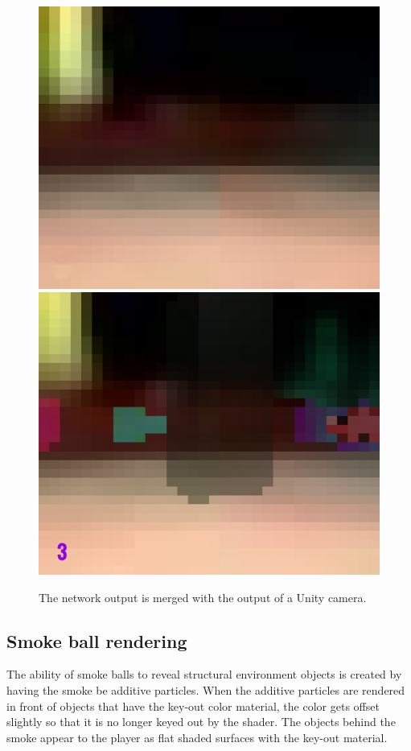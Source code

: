 \begin{figure}[p]
  \centering
  \includegraphics[width=\imgWidth]{images/neural_network_systems/NoOverlay.png} \\[\picVdist]
  \includegraphics[width=\imgWidth]{images/neural_network_systems/WithOverlay.png}
  \caption{The network output is merged with the output of a Unity camera.}
  \label{RenderMerge}
\end{figure}

\newpage
\subsection{Smoke ball rendering}\label{SmokeBallRendering}
The ability of smoke balls to reveal structural environment objects is created by having the smoke be additive particles. When the additive particles are rendered in front of objects that have the key-out color material, the color gets offset slightly so that it is no longer keyed out by the shader. The objects behind the smoke appear to the player as flat shaded surfaces with the key-out material.

